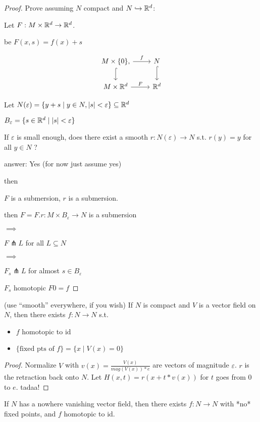 \documentclass[11pt,leqno,oneside]{amsart}
\newenvironment{dateenv}{
	\vspace{1em}
}{
	\vspace{1em}
}
\renewcommand{\epsilon}{\varepsilon}
\newcommand{\transverse}{\pitchfork}
\newcommand{\into}{\hookrightarrow}
\newcommand{\x}{\times}
\newcommand{\mydate}[4]{
	\newdate{#1}{#2}{#3}{#4}
	\begin{dateenv}
		\hfill\displaydate{#1}
	\end{dateenv}
}
\theoremstyle{mystyle} \newtheorem{thrm}[thm]{Theorem}
\theoremstyle{mystyle} \newtheorem{defi}[thm]{Definition}
\begin{document}
\begin{proof}
	Prove assuming $N$ compact and $N \into \R^d$:

	Let $\overset{~}{F}: M \x \R^d \to \R^d$.

	be $\overset{~}{F}(x,s) = f(x) + s$

	$$\begin{tikzcd}
		M \x \{0\} \arrow[r, "f"], \arrow[d, hook] & N \arrow[d, hook] \\
		M \x \R^d \arrow[r, "\overset{~}{F}"] & \R^d
	\end{tikzcd}$$

	Let $N(\epsilon) = \{ y+s \mid y \in N, |s| < \epsilon \} \subseteq \R^d$

	$B_{\epsilon} = \{ s \in \R^d \mid |s| < \epsilon \}$

	If $\epsilon$ is small enough, does there exist a smooth $r : N(\epsilon) \to N$ s.t. $r(y) = y$ for all $y \in N$ ?

	answer: Yes (for now just assume yes)

	then

	$\overset{~}{F}$ is a submersion, $r$ is a submersion.

	then $F = \overset{~}{F}.r : M \x B_\epsilon \to N$ is a submersion

	$\implies$

	$F \transverse L$ for all $L \subseteq N$

	$\implies$

	$F_s \transverse L$ for almost $s \in B_\epsilon$

	$F_s$ homotopic $F0 = f$

\end{proof}
\mydate{d10}{7}{11}{2016}
\begin{prop}
	(use ``smooth'' everywhere, if you wish)
	If $N$ is compact and $V$ is a vector field on $N$, then there exists $f: N \to N$ s.t.
	\begin{itemize}
		\item $f$ homotopic to $\text{id}$
		\item $\{ \text{fixed pts of } f \} = \{ x \mid V(x) = 0 \}$
	\end{itemize}
\end{prop}
\begin{proof}
	Normalize $V$ with $v(x) = \frac{V(x)}{mag(V(x))*e}$ are vectors of magnitude $\epsilon$.
	$r$ is the retraction back onto $N$.
	Let $H(x,t) = r(x + t*v(x))$ for $t$ goes from $0$ to $e$.
	tadaa!
\end{proof}
\begin{cor}[Bredon, 9]
	If $N$ has a nowhere vanishing vector field, then there exists $f: N \to N$ with *no* fixed points, and $f$ homotopic to id.
\end{cor}
\end{document}
